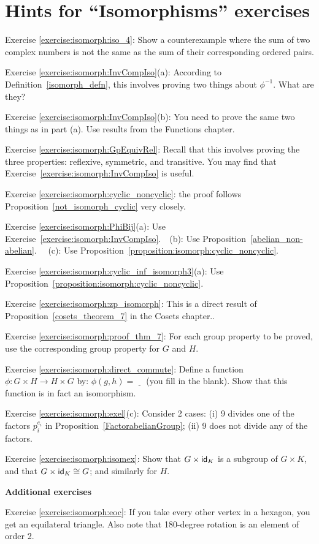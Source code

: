 \section{Hints for ``Isomorphisms'' exercises}\label{sec:isomorph:hints} 


\noindent Exercise \ref{exercise:isomorph:iso_4}:  Show a counterexample where the sum of two complex numbers is not the same as the sum of their corresponding ordered pairs.

\noindent Exercise \ref{exercise:isomorph:InvCompIso}(a):  According to Definition~\ref{isomorph_defn}, this involves proving two things about $\phi^{-1}$.  What are they?

\noindent Exercise \ref{exercise:isomorph:InvCompIso}(b): You need to prove the same two things as in part (a).  Use results from the Functions chapter.

\noindent Exercise \ref{exercise:isomorph:GpEquivRel}:   Recall that this involves proving the three properties: reflexive, symmetric, and transitive. You may find that Exercise~\ref{exercise:isomorph:InvCompIso}  is useful.

\noindent Exercise \ref{exercise:isomorph:cyclic_noncyclic}:   the proof follows Proposition~\ref{not_isomorph_cyclic} very closely.

\noindent Exercise \ref{exercise:isomorph:PhiBij}(a): Use Exercise~\ref{exercise:isomorph:InvCompIso}.~~(b):  Use Proposition~\ref{abelian_non-abelian}. ~~(c):  Use Proposition~\ref{proposition:isomorph:cyclic_noncyclic}. 

\noindent Exercise \ref{exercise:isomorph:cyclic_inf_isomorph3}(a): Use Proposition~\ref{proposition:isomorph:cyclic_noncyclic}.

\noindent Exercise \ref{exercise:isomorph:zp_isomorph}: This  is a direct result of Proposition~\ref{cosets_theorem_7} in the Cosets chapter..

\noindent Exercise \ref{exercise:isomorph:proof_thm_7}: For each group property to be proved, use the corresponding group property for $G$ and $H$.


\noindent Exercise \ref{exercise:isomorph:direct_commute}:
 Define a function $\phi:G \times H \rightarrow H \times G$ by:  $\phi(g,h) = \underline{~~~~}$ (you fill in the blank).  Show that this function is in fact an isomorphism. 

\noindent Exercise \ref{exercise:isomorph:exel}(c): Consider 2 cases: (i) 9 divides one of the factors $p_i^{e_i}$ in Proposition~\ref{FactorabelianGroup}; (ii) 9 does not divide any of the factors.

\noindent Exercise \ref{exercise:isomorph:isomex}:  Show that $G \times {\sf{i}d}_K$ is a subgroup of $G \times K$, and that $G \times {\sf{i}d}_K \cong G$; and similarly for $H$.
\medskip

\textbf{Additional exercises}

\noindent Exercise \ref{exercise:isomorph:eoc}: If you take every other vertex in a hexagon, you get an equilateral triangle. Also note that 180-degree rotation is an element of order 2.

